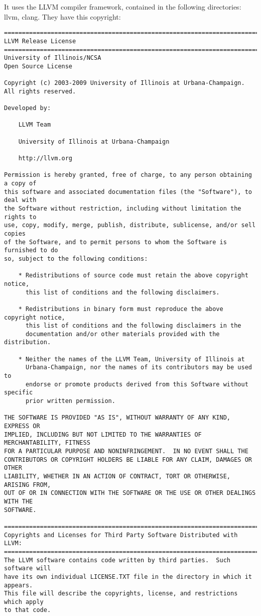 It uses the LLVM compiler framework, contained in the following directories:
llvm, clang. They have this copyright:
{\footnotesize
\begin{verbatim}
==============================================================================
LLVM Release License
==============================================================================
University of Illinois/NCSA
Open Source License

Copyright (c) 2003-2009 University of Illinois at Urbana-Champaign.
All rights reserved.

Developed by:

    LLVM Team

    University of Illinois at Urbana-Champaign

    http://llvm.org

Permission is hereby granted, free of charge, to any person obtaining a copy of
this software and associated documentation files (the "Software"), to deal with
the Software without restriction, including without limitation the rights to
use, copy, modify, merge, publish, distribute, sublicense, and/or sell copies
of the Software, and to permit persons to whom the Software is furnished to do
so, subject to the following conditions:

    * Redistributions of source code must retain the above copyright notice,
      this list of conditions and the following disclaimers.

    * Redistributions in binary form must reproduce the above copyright notice,
      this list of conditions and the following disclaimers in the
      documentation and/or other materials provided with the distribution.

    * Neither the names of the LLVM Team, University of Illinois at
      Urbana-Champaign, nor the names of its contributors may be used to
      endorse or promote products derived from this Software without specific
      prior written permission.

THE SOFTWARE IS PROVIDED "AS IS", WITHOUT WARRANTY OF ANY KIND, EXPRESS OR
IMPLIED, INCLUDING BUT NOT LIMITED TO THE WARRANTIES OF MERCHANTABILITY, FITNESS
FOR A PARTICULAR PURPOSE AND NONINFRINGEMENT.  IN NO EVENT SHALL THE
CONTRIBUTORS OR COPYRIGHT HOLDERS BE LIABLE FOR ANY CLAIM, DAMAGES OR OTHER
LIABILITY, WHETHER IN AN ACTION OF CONTRACT, TORT OR OTHERWISE, ARISING FROM,
OUT OF OR IN CONNECTION WITH THE SOFTWARE OR THE USE OR OTHER DEALINGS WITH THE
SOFTWARE.

==============================================================================
Copyrights and Licenses for Third Party Software Distributed with LLVM:
==============================================================================
The LLVM software contains code written by third parties.  Such software will
have its own individual LICENSE.TXT file in the directory in which it appears.
This file will describe the copyrights, license, and restrictions which apply
to that code.


\end{verbatim}}
